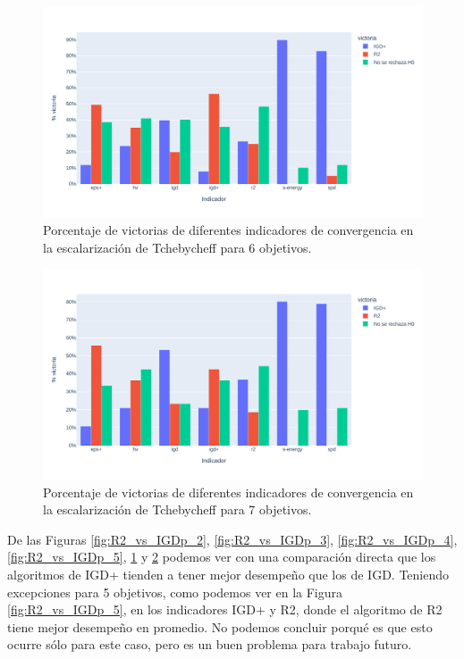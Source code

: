 \begin{figure} [H]
    \centering
\includegraphics[width=\textwidth]{Figuras/R2_vs_IGDp_nobj6.pdf}
\caption[IGD+ vs R2 6 objetivos]{Porcentaje de victorias de diferentes indicadores de convergencia en la escalarización de Tchebycheff para 6 objetivos.}
\label{fig:R2_vs_IGDp_6}
\end{figure}

\begin{figure} [H]
    \centering
\includegraphics[width=\textwidth]{Figuras/R2_vs_IGDp_nobj7.pdf}
\caption[IGD+ vs R2 7 objetivos]{Porcentaje de victorias de diferentes indicadores de convergencia en la escalarización de Tchebycheff para 7 objetivos.}
\label{fig:R2_vs_IGDp_7}
\end{figure}

De las Figuras \ref{fig:R2_vs_IGDp_2}, \ref{fig:R2_vs_IGDp_3}, \ref{fig:R2_vs_IGDp_4}, \ref{fig:R2_vs_IGDp_5}, \ref{fig:R2_vs_IGDp_6} y \ref{fig:R2_vs_IGDp_7}  podemos ver con una comparación directa que los algoritmos de IGD+ tienden a tener mejor desempeño que los de IGD. Teniendo excepciones para 5 objetivos, como podemos ver en la Figura \ref{fig:R2_vs_IGDp_5}, en los indicadores IGD+ y R2, donde el algoritmo de R2 tiene mejor desempeño en promedio. No podemos concluir porqué es que esto ocurre sólo para este caso, pero es un buen problema para trabajo futuro.

